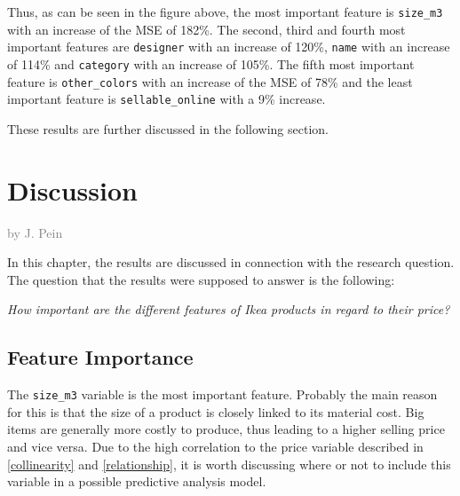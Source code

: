 \documentclass[a4paper, nobind]{templates/ociamthesis}
\begin{document}
Thus, as can be seen in the figure above, the most important feature is \texttt{size\_m3} with an increase of the MSE of 182\%. The second, third and fourth most important features are \texttt{designer} with an increase of 120\%, \texttt{name} with an increase of 114\% and \texttt{category} with an increase of 105\%. The fifth most important feature is \texttt{other\_colors} with an increase of the MSE of 78\% and the least important feature is \texttt{sellable\_online} with a 9\% increase.

These results are further discussed in the following section.

\hypertarget{discussion}{%
\chapter{Discussion}\label{discussion}}

\hfill\textcolor{gray}{by J. Pein}

In this chapter, the results are discussed in connection with the research question. The question that the results were supposed to answer is the following:

\emph{How important are the different features of Ikea products in regard to their price?}

\hypertarget{feature-importance-1}{%
\section{Feature Importance}\label{feature-importance-1}}

The \texttt{size\_m3} variable is the most important feature. Probably the main reason for this is that the size of a product is closely linked to its material cost. Big items are generally more costly to produce, thus leading to a higher selling price and vice versa. Due to the high correlation to the price variable described in \ref{collinearity} and \ref{relationship}, it is worth discussing where or not to include this variable in a possible predictive analysis model.
\end{document}
